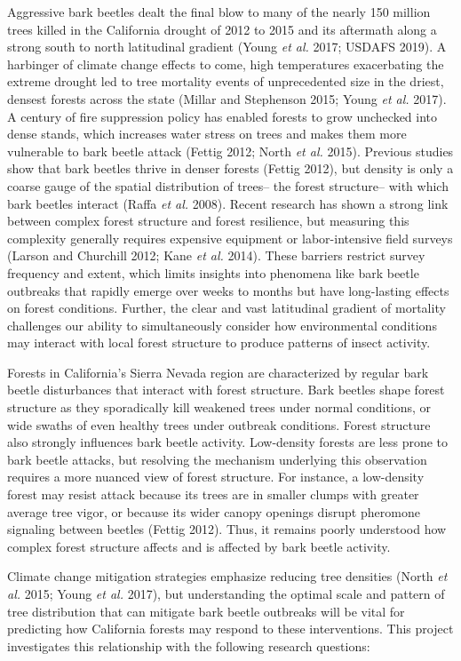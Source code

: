 \documentclass[]{article}
\begin{document}
Aggressive bark beetles dealt the final blow to many of the nearly 150
million trees killed in the California drought of 2012 to 2015 and its
aftermath along a strong south to north latitudinal gradient (Young
\emph{et al.} 2017; USDAFS 2019). A harbinger of climate change effects
to come, high temperatures exacerbating the extreme drought led to tree
mortality events of unprecedented size in the driest, densest forests
across the state (Millar and Stephenson 2015; Young \emph{et al.} 2017).
A century of fire suppression policy has enabled forests to grow
unchecked into dense stands, which increases water stress on trees and
makes them more vulnerable to bark beetle attack (Fettig 2012; North
\emph{et al.} 2015). Previous studies show that bark beetles thrive in
denser forests (Fettig 2012), but density is only a coarse gauge of the
spatial distribution of trees-- the forest structure-- with which bark
beetles interact (Raffa \emph{et al.} 2008). Recent research has shown a
strong link between complex forest structure and forest resilience, but
measuring this complexity generally requires expensive equipment or
labor-intensive field surveys (Larson and Churchill 2012; Kane \emph{et
al.} 2014). These barriers restrict survey frequency and extent, which
limits insights into phenomena like bark beetle outbreaks that rapidly
emerge over weeks to months but have long-lasting effects on forest
conditions. Further, the clear and vast latitudinal gradient of
mortality challenges our ability to simultaneously consider how
environmental conditions may interact with local forest structure to
produce patterns of insect activity.

Forests in California's Sierra Nevada region are characterized by
regular bark beetle disturbances that interact with forest structure.
Bark beetles shape forest structure as they sporadically kill weakened
trees under normal conditions, or wide swaths of even healthy trees
under outbreak conditions. Forest structure also strongly influences
bark beetle activity. Low-density forests are less prone to bark beetle
attacks, but resolving the mechanism underlying this observation
requires a more nuanced view of forest structure. For instance, a
low-density forest may resist attack because its trees are in smaller
clumps with greater average tree vigor, or because its wider canopy
openings disrupt pheromone signaling between beetles (Fettig 2012).
Thus, it remains poorly understood how complex forest structure affects
and is affected by bark beetle activity.

Climate change mitigation strategies emphasize reducing tree densities
(North \emph{et al.} 2015; Young \emph{et al.} 2017), but understanding
the optimal scale and pattern of tree distribution that can mitigate
bark beetle outbreaks will be vital for predicting how California
forests may respond to these interventions. This project investigates
this relationship with the following research questions:
\end{document}
